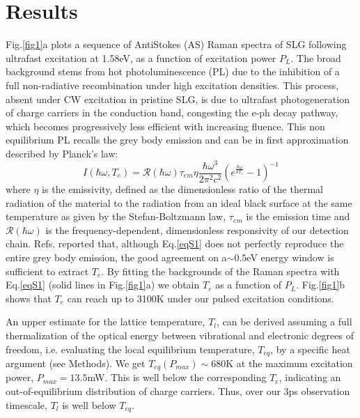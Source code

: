 \documentclass[aps, prl,twocolumn]{revtex4}
\begin{document}
\section*{Results}
Fig.\ref{fig1}a plots a sequence of AntiStokes (AS) Raman spectra of SLG following ultrafast excitation at 1.58eV, as a function of excitation power $P_L$. The broad background stems from hot photoluminescence (PL) due to the inhibition of a full non-radiative recombination under high excitation densities\cite{freitag_2010,Lui2010, Stohr2010, PhysRevLett.104.227401}. This process, absent under CW excitation in pristine SLG\cite{Gokus2009}, is due to ultrafast photogeneration of charge carriers in the conduction band, congesting the e-ph decay pathway, which becomes progressively less efficient with increasing fluence. This non equilibrium PL recalls the grey body emission and can be in first approximation described by Planck's law\cite{freitag_2010, Lui2010, PhysRevLett.104.227401, kim_bright_2015}:
\begin{equation}
I(\hbar\omega, T_{e})=\mathcal{R}(\hbar\omega)\tau_{em}\eta \frac{\hbar\omega^3}{2\pi^2c^2}\left(e^{\frac{\hbar \omega}{kT_{e}}}-1\right)^{-1}
\label{eqS1}
\end{equation}
where $\eta$ is the emissivity, defined as the dimensionless ratio of the thermal radiation of the material to the radiation from an ideal black surface at the same temperature as given by the Stefan-Boltzmann law\cite{callen_1985}, $\tau_{em}$ is the emission time and $\mathcal{R}(\hbar\omega)$ is the frequency-dependent, dimensionless responsivity of our detection chain\cite{princeton, princeton2}. Refs.\cite{kim_bright_2015,freitag_2010,Lui2010} reported that, although Eq.\ref{eqS1} does not perfectly reproduce the entire grey body emission, the good agreement on a$\sim0.5$eV energy window is sufficient to extract $T_e$. By fitting the backgrounds of the Raman spectra with Eq.\ref{eqS1} (solid lines in Fig.\ref{fig1}a) we obtain $T_e$ as a function of $P_L$. Fig.\ref{fig1}b shows that $T_e$ can reach up to 3100K under our pulsed excitation conditions.


An upper estimate for the lattice temperature, $T_l$, can be derived assuming a full thermalization of the optical energy between vibrational and electronic degrees of freedom, i.e. evaluating the local equilibrium temperature, $T_{eq}$, by a specific heat argument (see Methods). We get $T_{eq}(P_{max})\sim680$K at the maximum excitation power, $P_{max}=13.5$mW. This is well below the corresponding $T_e$, indicating an out-of-equilibrium distribution of charge carriers. Thus, over our 3ps observation timescale, $T_l$ is well below $T_{eq}$.
\end{document}
